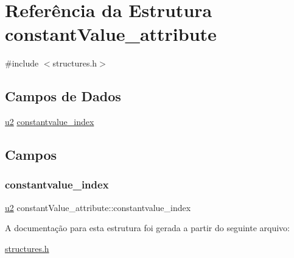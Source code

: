 \hypertarget{structconstantValue__attribute}{}\section{Referência da Estrutura constant\+Value\+\_\+attribute}
\label{structconstantValue__attribute}


{\ttfamily \#include $<$structures.\+h$>$}

\subsection*{Campos de Dados}
\begin{DoxyCompactItemize}
\item 
\hyperlink{lista__operandos_8h_a732cde1300aafb73b0ea6c2558a7a54f}{u2} \hyperlink{structconstantValue__attribute_a08104752941d024731797a40dbd2d79d}{constantvalue\+\_\+index}
\end{DoxyCompactItemize}


\subsection{Campos}
\mbox{\label{structconstantValue__attribute_a08104752941d024731797a40dbd2d79d}} 
\subsubsection{\texorpdfstring{constantvalue\+\_\+index}{constantvalue\_index}}
{\footnotesize\ttfamily \hyperlink{lista__operandos_8h_a732cde1300aafb73b0ea6c2558a7a54f}{u2} constant\+Value\+\_\+attribute\+::constantvalue\+\_\+index}



A documentação para esta estrutura foi gerada a partir do seguinte arquivo\+:\begin{DoxyCompactItemize}
\item 
\hyperlink{structures_8h}{structures.\+h}\end{DoxyCompactItemize}
